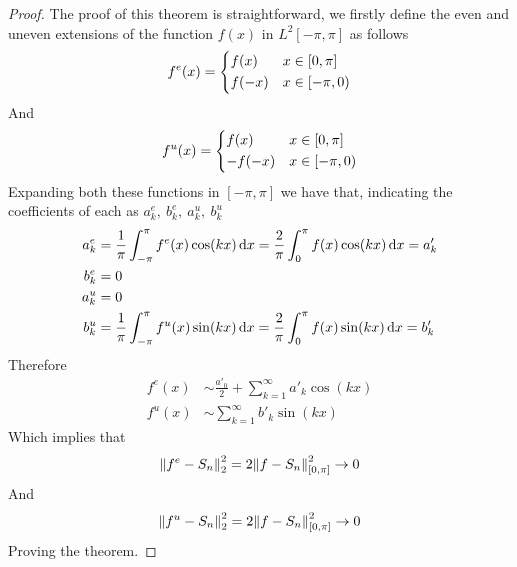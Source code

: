 \documentclass[../complete.tex]{subfiles}
\begin{document}
\begin{proof}
	The proof of this theorem is straightforward, we firstly define the even and uneven extensions of the function $f(x)$ in $L^2[-\pi,\pi]$ as follows
	\begin{equation*}
		f^e(x)=\begin{dcases}f(x)&x\in[0,\pi]\\f(-x)&x\in[-\pi,0)\end{dcases}
	\end{equation*}
	And
	\begin{equation*}
		f^u(x)=\begin{dcases}f(x)&x\in[0,\pi]\\-f(-x)&x\in[-\pi,0)\end{dcases}
	\end{equation*}
	Expanding both these functions in $[-\pi,\pi]$ we have that, indicating the coefficients of each as $a_k^e,\ b_k^e,\ a_k^u,\ b_k^u$
	\begin{equation*}
		\begin{aligned}
			a_k^e&=\frac{1}{\pi}\int_{-\pi}^{\pi}f^e(x)\cos(kx)\diff x=\frac{2}{\pi}\int_{0}^{\pi}f(x)\cos(kx)\diff x=a'_k\\
			b_k^e&=0\\
			a_k^u&=0\\
			b_k^u&=\frac{1}{\pi}\int_{-\pi}^{\pi}f^u(x)\sin(kx)\diff x=\frac{2}{\pi}\int_{0}^{\pi}f(x)\sin(kx)\diff x=b'_k
		\end{aligned}
	\end{equation*}
	Therefore
	\begin{equation*}
		\begin{aligned}
			f^e(x)&\sim\frac{a'_0}{2}+\sum_{k=1}^{\infty}a'_k\cos(kx)\\
			f^u(x)&\sim\sum_{k=1}^{\infty}b'_k\sin(kx)
		\end{aligned}
	\end{equation*}
	Which implies that
	\begin{equation*}
		\pnorm[2]{f^e-S_n}^2=2\norm{f-S_n}^2_{[0,\pi]}\to0
	\end{equation*}
	And
	\begin{equation*}
		\pnorm[2]{f^u-S_n}^2=2\norm{f-S_n}^2_{[0,\pi]}\to0
	\end{equation*}
	Proving the theorem.
\end{proof}
\end{document}
